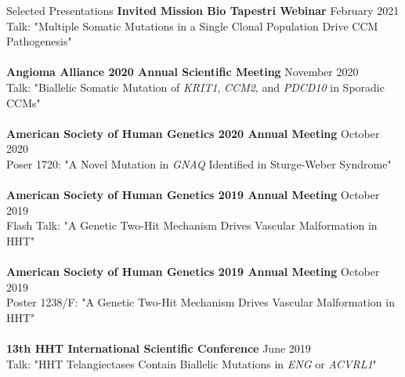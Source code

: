 \documentclass{resume} %
\begin{document}
\begin{rSection}{Selected Presentations}
{\bf Invited Mission Bio Tapestri Webinar} \hfill {February  2021}\\
Talk: "Multiple Somatic Mutations in a Single Clonal Population Drive CCM Pathogenesis"\\\\
{\bf Angioma Alliance 2020 Annual Scientific Meeting} \hfill {November 2020}\\
Talk: "Biallelic Somatic Mutation of \textit{KRIT1}, \textit{CCM2}, and \textit{PDCD10} in Sporadic CCMs"\\\\
{\bf American Society of Human Genetics 2020 Annual Meeting} \hfill {October 2020}\\
Poser 1720: "A Novel Mutation in \textit{GNAQ} Identified in Sturge-Weber Syndrome"\\\\
{\bf American Society of Human Genetics 2019 Annual Meeting} \hfill {October 2019}\\
Flash Talk: "A Genetic Two-Hit Mechanism Drives Vascular Malformation in HHT"\\\\
{\bf American Society of Human Genetics 2019 Annual Meeting} \hfill {October 2019}\\
Poster 1238/F: "A Genetic Two-Hit Mechanism Drives Vascular Malformation in HHT"\\\\
{\bf 13th HHT International Scientific Conference} \hfill {June 2019}\\
Talk: "HHT Telangiectases Contain Biallelic Mutations in \textit{ENG} or \textit{ACVRL1}"\\

\end{rSection}
\end{document}
